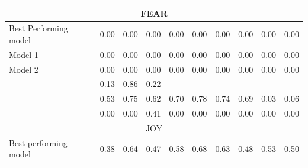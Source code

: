 \documentclass[
10pt, %
a4paper, %
oneside, %
headinclude,footinclude, %
BCOR5mm, %
]{scrartcl}
\begin{document}
\begin{table}[!htbp]
\begin{tabular}{|l|l|l|l|l|l|l|l|l|l|}
\hline
    \multicolumn{10}{|c|}{{FEAR}} \\ 

\hline
    \tiny{Best Performing model} & 
    \footnotesize{0.00} & 
    \footnotesize{0.00} & 
    \footnotesize{0.00} & 
    \footnotesize{0.00} & 
    \footnotesize{0.00} & 
    \footnotesize{0.00} & 
    \footnotesize{0.00} & 
    \footnotesize{0.00} & 
    \footnotesize{0.00} \\ 

\hline
    \tiny{Model 1} & 
    \footnotesize{0.00} & 
    \footnotesize{0.00} & 
    \footnotesize{0.00} & 
    \footnotesize{0.00} & 
    \footnotesize{0.00} & 
    \footnotesize{0.00} & 
    \footnotesize{0.00} & 
    \footnotesize{0.00} & 
    \footnotesize{0.00} \\ 

\hline
    \tiny{Model 2} & 
    \footnotesize{0.00} & 
    \footnotesize{0.00} & 
    \footnotesize{0.00} & 
    \footnotesize{0.00} & 
    \footnotesize{0.00} & 
    \footnotesize{0.00} & 
    \footnotesize{0.00} & 
    \footnotesize{0.00} & 
    \footnotesize{0.00} \\     

\hline
    \tiny{\citep{strapparava2008learning} } &
    \footnotesize{0.13} & 
    \footnotesize{0.86} & 
    \footnotesize{0.22} & 
    &
    &
    &
    &
    &
    \\

\hline
    \tiny{\citep{kim2010evaluation} } &
    \footnotesize{0.53} & 
    \footnotesize{0.75} & 
    \footnotesize{0.62} &
    \footnotesize{0.70} & 
    \footnotesize{0.78} & 
    \footnotesize{0.74} &
    \footnotesize{0.69} & 
    \footnotesize{0.03} & 
    \footnotesize{0.06} \\

\hline
    \tiny{\citep{danisman2008feeler} } &
    \footnotesize{0.00} & 
    \footnotesize{0.00} & 
    \footnotesize{0.41} &
    \footnotesize{0.00} & 
    \footnotesize{0.00} & 
    \footnotesize{0.00} &
    \footnotesize{0.00} & 
    \footnotesize{0.00} & 
    \footnotesize{0.00} \\

\hline
    \multicolumn{10}{|c|}{{JOY}} \\ 

\hline
    \tiny{Best performing model} & 
    \footnotesize{0.38} & 
    \footnotesize{0.64} & 
    \footnotesize{0.47} & 
    \footnotesize{0.58} & 
    \footnotesize{0.68} & 
    \footnotesize{0.63} & 
    \footnotesize{0.48} & 
    \footnotesize{0.53} & 
    \footnotesize{0.50} \\ 


\end{tabular}
\end{table}
\end{document}
